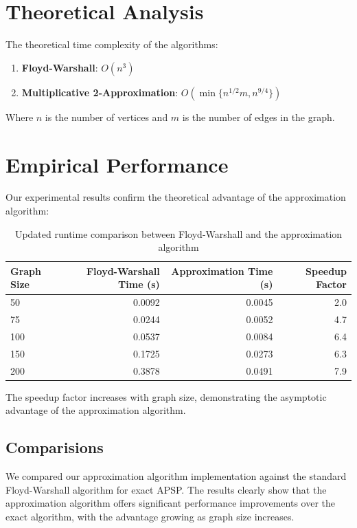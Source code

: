 \documentclass[a4paper,11pt,oneside]{book}
\begin{document}
\section*{Theoretical Analysis}

The theoretical time complexity of the algorithms:

\begin{enumerate}
    \item \textbf{Floyd-Warshall}: $O(n^3)$
    \item \textbf{Multiplicative 2-Approximation}: $O(\min\{n^{1/2}m, n^{9/4}\})$
\end{enumerate}

Where $n$ is the number of vertices and $m$ is the number of edges in the graph.

\section*{Empirical Performance}

Our experimental results confirm the theoretical advantage of the approximation algorithm:

\begin{table}[h]
\centering
\begin{tabular}{@{}lrrr@{}}
\toprule
\textbf{Graph Size} & \textbf{Floyd-Warshall Time (s)} & \textbf{Approximation Time (s)} & \textbf{Speedup Factor} \\
\midrule
50  & 0.0092 & 0.0045 & 2.0 \\
75  & 0.0244 & 0.0052 & 4.7 \\
100 & 0.0537 & 0.0084 & 6.4 \\
150 & 0.1725 & 0.0273 & 6.3 \\
200 & 0.3878 & 0.0491 & 7.9 \\
\bottomrule
\end{tabular}
\caption{Updated runtime comparison between Floyd-Warshall and the approximation algorithm}
\end{table}


The speedup factor increases with graph size, demonstrating the asymptotic advantage of the approximation algorithm.
\subsection{Comparisions}

We compared our approximation algorithm implementation against the standard Floyd-Warshall algorithm for exact APSP. The results clearly show that the approximation algorithm offers significant performance improvements over the exact algorithm, with the advantage growing as graph size increases.
\end{document}
